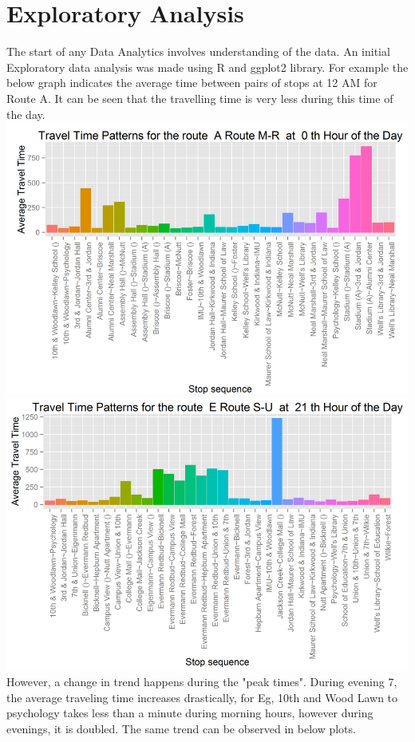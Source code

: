 \documentclass[12pt]{article}\usepackage[]{graphicx}\usepackage[]{color}
\begin{document}
\section{Exploratory Analysis}
The start of  any Data Analytics involves understanding of the data. An initial Exploratory data analysis was made using R and ggplot2 library. For example the below graph indicates the average time between pairs of stops at 12 AM for Route A. It can be seen that the travelling time is very less during this time of the day. \\
\includegraphics[scale=0.4]{resources/ggplot1}\\[1cm] 
\includegraphics[scale=0.4]{resources/ggplot2}\\[1cm] 
However, a change in trend happens during the "peak times". During evening 7, the average traveling time increases drastically, for Eg, 10th and Wood Lawn to psychology takes less than a minute during morning hours, however during evenings, it is doubled. The same trend can be observed in below plots. \\
\end{document}
